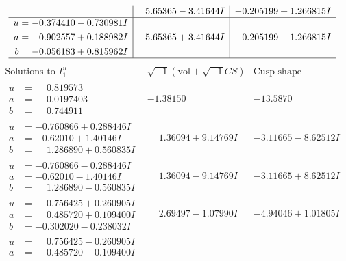 \documentclass[1p]{elsarticle_modified}
\theoremstyle{definition}
\newcommand{\I}{\sqrt{-1}}
\begin{document}
$$\begin{array}{c|c|c}
 & \phantom{-}5.65365 - 3.41644 I & -0.205199 + 1.266815 I \\ \hline\begin{aligned}
u &= -0.374410 - 0.730981 I \\
a &= \phantom{-}0.902557 + 0.188982 I \\
b &= -0.056183 + 0.815962 I\end{aligned}
 & \phantom{-}5.65365 + 3.41644 I & -0.205199 - 1.266815 I\\
 \hline 
 \end{array}$$\newpage$$\begin{array}{c|c|c}  
\text{Solutions to }I^u_{1}& \I (\text{vol} + \sqrt{-1}CS) & \text{Cusp shape}\\
 \hline 
\begin{aligned}
u &= \phantom{-}0.819573\phantom{ +0.000000I} \\
a &= \phantom{-}0.0197403\phantom{ +0.000000I} \\
b &= \phantom{-}0.744911\phantom{ +0.000000I}\end{aligned}
 & -1.38150\phantom{ +0.000000I} & -13.5870\phantom{ +0.000000I} \\ \hline\begin{aligned}
u &= -0.760866 + 0.288446 I \\
a &= -0.62010 + 1.40146 I \\
b &= \phantom{-}1.286890 + 0.560835 I\end{aligned}
 & \phantom{-}1.36094 + 9.14769 I & -3.11665 - 8.62512 I \\ \hline\begin{aligned}
u &= -0.760866 - 0.288446 I \\
a &= -0.62010 - 1.40146 I \\
b &= \phantom{-}1.286890 - 0.560835 I\end{aligned}
 & \phantom{-}1.36094 - 9.14769 I & -3.11665 + 8.62512 I \\ \hline\begin{aligned}
u &= \phantom{-}0.756425 + 0.260905 I \\
a &= \phantom{-}0.485720 + 0.109400 I \\
b &= -0.302020 - 0.238032 I\end{aligned}
 & \phantom{-}2.69497 - 1.07990 I & -4.94046 + 1.01805 I \\ \hline\begin{aligned}
u &= \phantom{-}0.756425 - 0.260905 I \\
a &= \phantom{-}0.485720 - 0.109400 I \\

\end{aligned}
\end{array}$$
\end{document}
